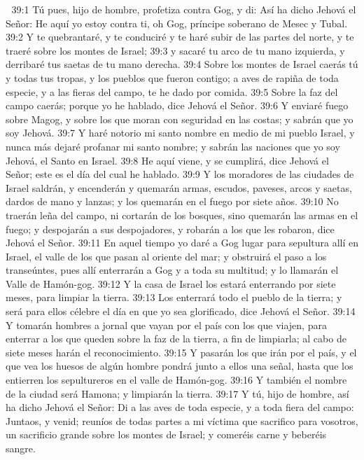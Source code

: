
39:1 Tú pues, hijo de hombre, profetiza contra Gog, y di: Así ha dicho Jehová el Señor: He aquí yo estoy contra ti, oh Gog, príncipe soberano de Mesec y Tubal.  
39:2 Y te quebrantaré, y te conduciré y te haré subir de las partes del norte, y te traeré sobre los montes de Israel;  
39:3 y sacaré tu arco de tu mano izquierda, y derribaré tus saetas de tu mano derecha.  
39:4 Sobre los montes de Israel caerás tú y todas tus tropas, y los pueblos que fueron contigo; a aves de rapiña de toda especie, y a las fieras del campo, te he dado por comida.  
39:5 Sobre la faz del campo caerás; porque yo he hablado, dice Jehová el Señor.  
39:6 Y enviaré fuego sobre Magog, y sobre los que moran con seguridad en las costas; y sabrán que yo soy Jehová.  
39:7 Y haré notorio mi santo nombre en medio de mi pueblo Israel, y nunca más dejaré profanar mi santo nombre; y sabrán las naciones que yo soy Jehová, el Santo en Israel.  
39:8 He aquí viene, y se cumplirá, dice Jehová el Señor; este es el día del cual he hablado.  
39:9 Y los moradores de las ciudades de Israel saldrán, y encenderán y quemarán armas, escudos, paveses, arcos y saetas, dardos de mano y lanzas; y los quemarán en el fuego por siete años.  
39:10 No traerán leña del campo, ni cortarán de los bosques, sino quemarán las armas en el fuego; y despojarán a sus despojadores, y robarán a los que les robaron, dice Jehová el Señor.  
39:11 En aquel tiempo yo daré a Gog lugar para sepultura allí en Israel, el valle de los que pasan al oriente del mar; y obstruirá el paso a los transeúntes, pues allí enterrarán a Gog y a toda su multitud; y lo llamarán el Valle de Hamón-gog.  
39:12 Y la casa de Israel los estará enterrando por siete meses, para limpiar la tierra.  
39:13 Los enterrará todo el pueblo de la tierra; y será para ellos célebre el día en que yo sea glorificado, dice Jehová el Señor.  
39:14 Y tomarán hombres a jornal que vayan por el país con los que viajen, para enterrar a los que queden sobre la faz de la tierra, a fin de limpiarla; al cabo de siete meses harán el reconocimiento.  
39:15 Y pasarán los que irán por el país, y el que vea los huesos de algún hombre pondrá junto a ellos una señal, hasta que los entierren los sepultureros en el valle de Hamón-gog.  
39:16 Y también el nombre de la ciudad será Hamona; y limpiarán la tierra.  
39:17 Y tú, hijo de hombre, así ha dicho Jehová el Señor: Di a las aves de toda especie, y a toda fiera del campo: Juntaos, y venid; reuníos de todas partes a mi víctima que sacrifico para vosotros, un sacrificio grande sobre los montes de Israel; y comeréis carne y beberéis sangre.  

